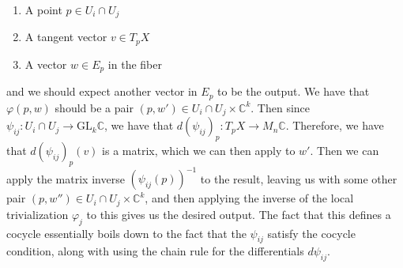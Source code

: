 \documentclass[psamsfonts, 12pt]{amsart}
\theoremstyle{definition}
\theoremstyle{remark}
\newcommand{\C}{\mathbb{C}}
\newcommand{\GL}{\mathrm{GL}}
\newcommand{\inv}{^{-1}}
\begin{document}
\begin{enumerate}
  \item A point $p \in U_i \cap U_j$
  \item A tangent vector $v \in T_pX$
  \item A vector $w \in E_p$ in the fiber
\end{enumerate}
%
and we should expect another vector in $E_p$ to be the output. We have that
$\varphi(p,w)$ should be a pair $(p, w') \in U_i \cap U_j \times \C^k$. Then
since $\psi_{ij} : U_i \cap U_j \to \GL_k\C$, we have that
$d(\psi_{ij})_p : T_pX \to M_n\C$. Therefore, we have that
$d(\psi_{ij})_p(v)$ is a matrix, which we can then apply to $w'$.
Then we can apply the matrix inverse $(\psi_{ij}(p))\inv$ to the result, leaving
us with some other pair $(p,w'') \in U_i \cap U_j \times \C^k$, and then applying the
inverse of the local trivialization $\varphi_j$ to this gives us the desired output.
The fact that this defines a cocycle essentially boils down to the fact that the
$\psi_{ij}$ satisfy the cocycle condition, along with using the chain rule for
the differentials $d\psi_{ij}$.
%
%
\newpage
%
\nocite{*}
%
\printbibliography
%
\end{document}
